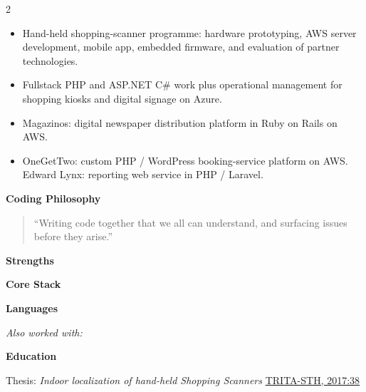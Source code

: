 \documentclass[10pt,a4paper,ragged2e,withhyper]{altacv}
\renewcommand{\cvsection}[1]{%
  \par\addvspace{1ex}%
  {\cvsectionfont\color{heading}#1}\par
  \smallskip{\color{headingrule}\rule{\linewidth}{1pt}}\par\smallskip}
\renewcommand{\cvsectionfont}{\LARGE\rmfamily\bfseries}
\begin{document}
\begin{paracol}{2}
\begin{itemize}
  \item Hand-held shopping-scanner programme: hardware prototyping,
    AWS server development, mobile app, embedded firmware, and
    evaluation of partner technologies.
  \item Fullstack PHP and ASP.NET C\# work plus operational
    management for shopping kiosks and digital signage on Azure.
\end{itemize}
\divider

\begin{itemize}
  \item Magazinos: digital newspaper distribution platform in Ruby
    on Rails on AWS.
  \item OneGetTwo: custom PHP / WordPress booking-service platform on
    AWS. Edward Lynx: reporting web service in PHP / Laravel.
\end{itemize}

\switchcolumn

\cvsection{Coding Philosophy}

\begin{quote}
``Writing code together that we all can understand, and surfacing issues before they arise.''
\end{quote}

\cvsection{Strengths}


\cvsection{Core Stack}


\cvsection{Languages}

\smallskip

\textit{Also worked with:}             
\cvsection{Education}

Thesis: \emph{Indoor localization of hand-held Shopping Scanners} \href{http://kth.diva-portal.org/smash/record.jsf?pid=diva2\%3A1108974}{TRITA-STH, 2017:38}

\end{paracol}
\end{document}
